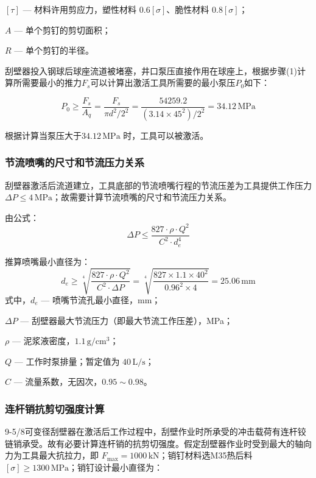 $[\tau]$ — 材料许用剪应力，塑性材料 0.6$[\sigma]$、脆性材料 0.8$[\sigma]$；

$A$ — 单个剪钉的剪切面积；

$R$ — 单个剪钉的半径。

刮壁器投入钢球后球座流道被堵塞，井口泵压直接作用在球座上，根据步骤(1)计算所需要最小的推力$F_s$可以计算出激活工具所需要的最小泵压$P_0$如下：

\begin{equation}
    P_0 \ge \frac{F_s}{A_q} = \frac{F_s}{\pi d^2 / 2^2} = \frac{54259.2}{(3.14 \times 45^2) / 2^2} = 34.12\,\mathrm{MPa}
\end{equation}

根据计算当泵压大于$34.12\,\mathrm{MPa}$ 时，工具可以被激活。

\subsubsection{节流喷嘴的尺寸和节流压力关系}
刮壁器激活后流道建立，工具底部的节流喷嘴行程的节流压差为工具提供工作压力 $\Delta P \le 4\,\mathrm{MPa}$；故需要计算节流喷嘴的尺寸和节流压力关系。

由公式：
\begin{equation}
    \Delta P \le \frac{827 \cdot \rho \cdot Q^2}{C^2 \cdot d_e^4}
\end{equation}

推算喷嘴最小直径为：
\begin{equation}
    d_e \ge \sqrt[4]{\frac{827 \cdot \rho \cdot Q^2}{C^2 \cdot \Delta P}} = \sqrt[4]{\frac{827 \times 1.1 \times 40^2}{0.96^2 \times 4}} = 25.06\,\mathrm{mm}
\end{equation}
式中，$d_e$ — 喷嘴节流孔最小直径，mm；

    $\Delta P$ — 刮壁器最大节流压力（即最大节流工作压差），MPa；
    
   $\rho$ — 泥浆液密度，$1.1\,\mathrm{g/cm^3}$；
   
    $Q$ — 工作时泵排量；暂定值为 $40\,\mathrm{L/s}$；
    
    $C$ — 流量系数，无因次，$0.95 \sim 0.98$。

\subsubsection{连杆销抗剪切强度计算}
9-5/8\inch 可变径刮壁器在激活后工作过程中，刮壁作业时所承受的冲击载荷有连杆铰链销承受。故有必要计算连杆销的抗剪切强度。假定刮壁器作业时受到最大的轴向力为工具最大抗拉力，即 $F_{\max} = 1000\,\mathrm{kN}$；销钉材料选M35热后料$[\sigma] \ge 1300\,\mathrm{MPa}$；销钉设计最小直径为：

